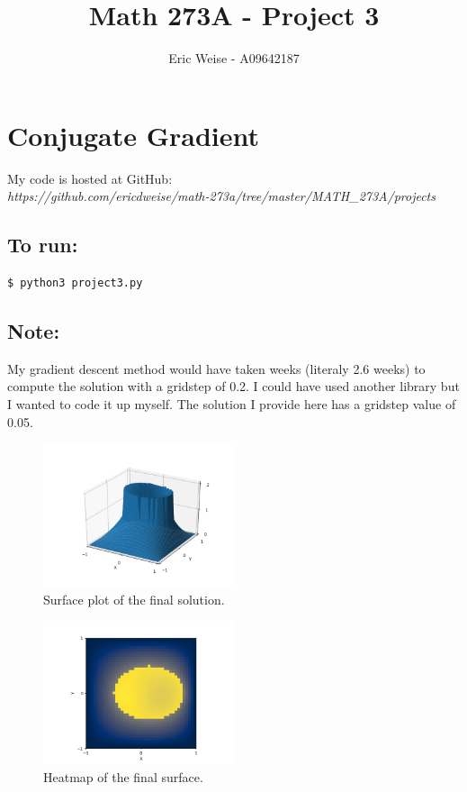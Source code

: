 \documentclass{article}
\title{Math 273A - Project 3}
\author{Eric Weise - A09642187}
\begin{document}
\maketitle

\section*{Conjugate Gradient}

My code is hosted at GitHub:\\
{\it https://github.com/ericdweise/math-273a/tree/master/MATH\_273A/projects}

\subsection*{To run:}
\begin{verbatim}$ python3 project3.py\end{verbatim}

\subsection*{Note:}
My gradient descent method would have taken weeks (literaly 2.6 weeks) to compute the solution with a gridstep of 0.2. I could have used another library but I wanted to code it up myself. The solution I provide here has a gridstep value of 0.05.

\begin{figure}[H]
    \caption{Surface plot of the final solution.}
    \centering
        \includegraphics[width=0.5\textwidth]{step-05-surface.png}
\end{figure}

\begin{figure}[H]
    \caption{Heatmap of the final surface.}
    \centering
        \includegraphics[width=0.5\textwidth]{step-05-heatmap.png}
\end{figure}
\end{document}
